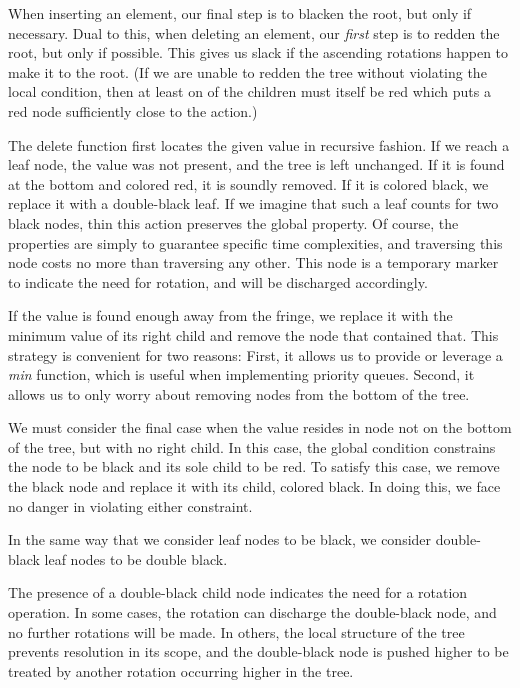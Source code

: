 \documentclass[preprint]{sigplanconf}
\begin{document}
When inserting an element, our final step is to blacken the root, but only if necessary. Dual to this, when deleting an element, our \emph{first} step is to redden the root, but only if possible. This gives us slack if the ascending rotations happen to make it to the root. (If we are unable to redden the tree without violating the local condition, then at least on of the children must itself be red which puts a red node sufficiently close to the action.)

The delete function first locates the given value in recursive fashion. If we reach a leaf node, the value was not present, and the tree is left unchanged. If it is found at the bottom and colored red, it is soundly removed. If it is colored black, we replace it with a double-black leaf. If we imagine that such a leaf counts for two black nodes, thin this action preserves the global property. Of course, the properties are simply to guarantee specific time complexities, and traversing this node costs no more than traversing any other. This node is a temporary marker to indicate the need for rotation, and will be discharged accordingly.

If the value is found enough away from the fringe, we replace it with the minimum value of its right child and remove the node that contained that. This strategy is convenient for two reasons: First, it allows us to provide or leverage a \emph{min} function, which is useful when implementing priority queues. Second, it allows us to only worry about removing nodes from the bottom of the tree.

We must consider the final case when the value resides in node not on the bottom of the tree, but with no right child. In this case, the global condition constrains the node to be black and its sole child to be red. To satisfy this case, we remove the black node and replace it with its child, colored black. In doing this, we face no danger in violating either constraint.

In the same way that we consider leaf nodes to be black, we consider double-black leaf nodes to be double black.

The presence of a double-black child node indicates the need for a rotation operation. In some cases, the rotation can discharge the double-black node, and no further rotations will be made. In others, the local structure of the tree prevents resolution in its scope, and the double-black node is pushed higher to be treated by another rotation occurring higher in the tree.
\end{document}

